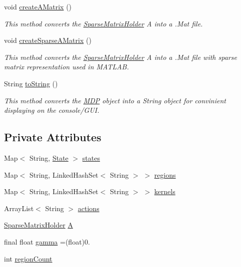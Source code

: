 \begin{DoxyCompactItemize}
void \hyperlink{classese_1_1seas_1_1upenn_1_1edu_1_1_m_d_p_aa2388cc570c1221db8965bd67ebce964}{create\+A\+Matrix} ()
\begin{DoxyCompactList}\small\item\em This method converts the \hyperlink{classese_1_1seas_1_1upenn_1_1edu_1_1_sparse_matrix_holder}{Sparse\+Matrix\+Holder} A into a .Mat file. \end{DoxyCompactList}\item 
void \hyperlink{classese_1_1seas_1_1upenn_1_1edu_1_1_m_d_p_a51c6b56c16b57e8beb6e78f38909ab11}{create\+Sparse\+A\+Matrix} ()
\begin{DoxyCompactList}\small\item\em This method converts the \hyperlink{classese_1_1seas_1_1upenn_1_1edu_1_1_sparse_matrix_holder}{Sparse\+Matrix\+Holder} A into a .Mat file with sparse matrix representation used in M\+A\+T\+L\+A\+B. \end{DoxyCompactList}\item 
String \hyperlink{classese_1_1seas_1_1upenn_1_1edu_1_1_m_d_p_a737a653ca7246055a11983d4e2bbc915}{to\+String} ()
\begin{DoxyCompactList}\small\item\em This method converts the \hyperlink{classese_1_1seas_1_1upenn_1_1edu_1_1_m_d_p}{M\+D\+P} object into a String object for convinient displaying on the console/\+G\+U\+I. \end{DoxyCompactList}\end{DoxyCompactItemize}
\subsection*{Private Attributes}
\begin{DoxyCompactItemize}
\item 
Map$<$ String, \hyperlink{classese_1_1seas_1_1upenn_1_1edu_1_1_state}{State} $>$ \hyperlink{classese_1_1seas_1_1upenn_1_1edu_1_1_m_d_p_a6d9956c1180bfa49e36daf7a9348ee49}{states}
\item 
Map$<$ String, Linked\+Hash\+Set$<$ String $>$ $>$ \hyperlink{classese_1_1seas_1_1upenn_1_1edu_1_1_m_d_p_a168a72d2ae768cb6a747e3124e008ed1}{regions}
\item 
Map$<$ String, Linked\+Hash\+Set$<$ String $>$ $>$ \hyperlink{classese_1_1seas_1_1upenn_1_1edu_1_1_m_d_p_a3bbc6750e60a6563cbcb7ff6f5035bfc}{kernels}
\item 
Array\+List$<$ String $>$ \hyperlink{classese_1_1seas_1_1upenn_1_1edu_1_1_m_d_p_a9035cb3560de616df30a1eb85af72e74}{actions}
\item 
\hyperlink{classese_1_1seas_1_1upenn_1_1edu_1_1_sparse_matrix_holder}{Sparse\+Matrix\+Holder} \hyperlink{classese_1_1seas_1_1upenn_1_1edu_1_1_m_d_p_a550a07d803fa2a90eb542b95670fd55b}{A}
\item 
final float \hyperlink{classese_1_1seas_1_1upenn_1_1edu_1_1_m_d_p_aaf5ea15587eab978e973ffad523ffc16}{gamma} =(float)0.
\item 
int \hyperlink{classese_1_1seas_1_1upenn_1_1edu_1_1_m_d_p_ab06e750b3f8875deaacb13a575fcde5e}{region\+Count}
\end{DoxyCompactItemize}


